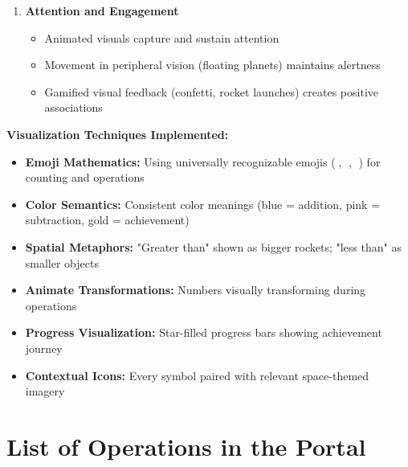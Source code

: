 \documentclass[12pt, a4paper]{article}
\begin{document}
\begin{tcolorbox}[colback=aliengreen!5, colframe=aliengreen, title=\textbf{Visualization: The Core Learning Mechanism}]
\begin{enumerate}[leftmargin=*, itemsep=10pt]
    \item \textbf{Attention and Engagement}
    \begin{itemize}
        \item Animated visuals capture and sustain attention
        \item Movement in peripheral vision (floating planets) maintains alertness
        \item Gamified visual feedback (confetti, rocket launches) creates positive associations
    \end{itemize}
\end{enumerate}

\textbf{Visualization Techniques Implemented:}

\begin{itemize}[leftmargin=*]
    \item \textbf{Emoji Mathematics:} Using universally recognizable emojis (🍎, 🌟, 🚀) for counting and operations
    \item \textbf{Color Semantics:} Consistent color meanings (blue = addition, pink = subtraction, gold = achievement)
    \item \textbf{Spatial Metaphors:} "Greater than" shown as bigger rockets; "less than" as smaller objects
    \item \textbf{Animate Transformations:} Numbers visually transforming during operations
    \item \textbf{Progress Visualization:} Star-filled progress bars showing achievement journey
    \item \textbf{Contextual Icons:} Every symbol paired with relevant space-themed imagery
\end{itemize}

\end{tcolorbox}

\section{List of Operations in the Portal}
\end{document}

